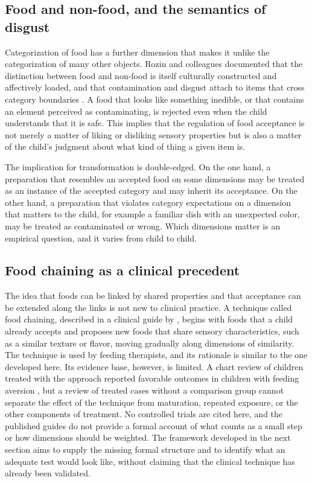 \documentclass[11pt]{article}
\theoremstyle{remark}
\begin{document}
\subsection{Food and non-food, and the semantics of disgust}

Categorization of food has a further dimension that makes it unlike the categorization of many other objects. Rozin and colleagues documented that the distinction between food and non-food is itself culturally constructed and affectively loaded, and that contamination and disgust attach to items that cross category boundaries \citep{rozin1980psychological,rozin1987perspective}. A food that looks like something inedible, or that contains an element perceived as contaminating, is rejected even when the child understands that it is safe. This implies that the regulation of food acceptance is not merely a matter of liking or disliking sensory properties but is also a matter of the child's judgment about what kind of thing a given item is.

The implication for transformation is double-edged. On the one hand, a preparation that resembles an accepted food on some dimensions may be treated as an instance of the accepted category and may inherit its acceptance. On the other hand, a preparation that violates category expectations on a dimension that matters to the child, for example a familiar dish with an unexpected color, may be treated as contaminated or wrong. Which dimensions matter is an empirical question, and it varies from child to child.

\subsection{Food chaining as a clinical precedent}

The idea that foods can be linked by shared properties and that acceptance can be extended along the links is not new to clinical practice. A technique called food chaining, described in a clinical guide by \citet{fraker2007food}, begins with foods that a child already accepts and proposes new foods that share sensory characteristics, such as a similar texture or flavor, moving gradually along dimensions of similarity. The technique is used by feeding therapists, and its rationale is similar to the one developed here. Its evidence base, however, is limited. A chart review of children treated with the approach reported favorable outcomes in children with feeding aversion \citep{fishbein2006food}, but a review of treated cases without a comparison group cannot separate the effect of the technique from maturation, repeated exposure, or the other components of treatment. No controlled trials are cited here, and the published guides do not provide a formal account of what counts as a small step or how dimensions should be weighted. The framework developed in the next section aims to supply the missing formal structure and to identify what an adequate test would look like, without claiming that the clinical technique has already been validated.
\end{document}
